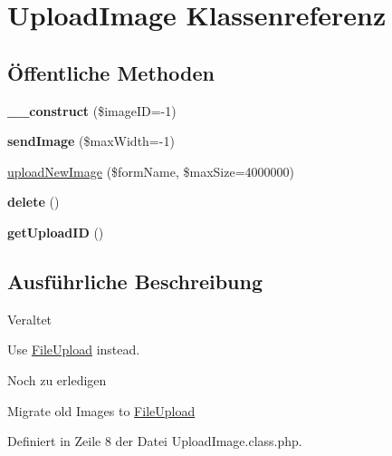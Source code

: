 \hypertarget{class_upload_image}{}\section{Upload\+Image Klassenreferenz}
\label{class_upload_image}
\subsection*{Öffentliche Methoden}
\begin{DoxyCompactItemize}
\item 
\mbox{\label{class_upload_image_abbc32cd3c3f4c36f947d731578d6c782}} 
{\bfseries \+\_\+\+\_\+construct} (\$image\+ID=-\/1)
\item 
\mbox{\label{class_upload_image_afdf7f82eb661f887462440a933e1a29f}} 
{\bfseries send\+Image} (\$max\+Width=-\/1)
\item 
\mbox{\hyperlink{class_upload_image_ae4f21ae36f850f3a2d2afe60337330aa}{upload\+New\+Image}} (\$form\+Name, \$max\+Size=4000000)
\item 
\mbox{\label{class_upload_image_a569e91881704cbe710cb3b26a618a133}} 
{\bfseries delete} ()
\item 
\mbox{\label{class_upload_image_a0bee4c9aa2393494ec9a75ec8e2ee642}} 
{\bfseries get\+Upload\+ID} ()
\end{DoxyCompactItemize}


\subsection{Ausführliche Beschreibung}
\begin{DoxyRefDesc}{Veraltet}
\item[\mbox{\hyperlink{deprecated__deprecated000044}{Veraltet}}]Use \mbox{\hyperlink{class_file_upload}{File\+Upload}} instead. \end{DoxyRefDesc}
\begin{DoxyRefDesc}{Noch zu erledigen}
\item[\mbox{\hyperlink{todo__todo000002}{Noch zu erledigen}}]Migrate old Images to \mbox{\hyperlink{class_file_upload}{File\+Upload}} \end{DoxyRefDesc}


Definiert in Zeile 8 der Datei Upload\+Image.\+class.\+php.



